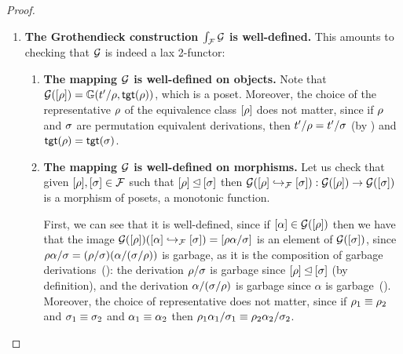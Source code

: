 \begin{proof}
\begin{enumerate}
\item {\bf The Grothendieck construction $\int_{\mathcal{F}}{\mathcal{G}}$ is well-defined.}
  This amounts to checking that $\mathcal{G}$ is indeed a lax 2-functor:
  \begin{enumerate}
  \item {\bf The mapping $\mathcal{G}$ is well-defined on objects.}
    Note that $\mathcal{G}({[\rho]}) = \mathbb{G}(t'/\rho, \mathsf{tgt}(\rho))$, which is a poset.
    Moreover, the choice of the representative $\rho$ of the equivalence class ${[\rho]}$
    does not matter,
    since if $\rho$ and $\sigma$ are permutation equivalent derivations,
    then $t'/\rho = t'/\sigma$ (by )
    and $\mathsf{tgt}(\rho) = \mathsf{tgt}(\sigma)$.
  \item {\bf The mapping $\mathcal{G}$ is well-defined on morphisms.}
    Let us check that given ${[\rho]},{[\sigma]} \in \mathcal{F}$
    such that ${[\rho]} \unlhd {[\sigma]}$
    then
    $
      \mathcal{G}({[\rho]} \hookrightarrow_{\mathcal{F}} {[\sigma]}) : \mathcal{G}({[\rho]}) \to \mathcal{G}({[\sigma]})
    $ is a morphism of posets, \ie a monotonic function.

    First, we can see that it is well-defined,
    since if ${[\alpha]} \in \mathcal{G}([\rho])$
    then we have that the image $\mathcal{G}({[\rho]})({[\alpha]} \hookrightarrow_{\mathcal{F}} {[\sigma]}) = {[\rho\alpha/\sigma]}$
    is an element of $\mathcal{G}([\sigma])$,
    since
    $
      \rho\alpha/\sigma = (\rho/\sigma)(\alpha/(\sigma/\rho))
    $
    is garbage, as it is the composition of garbage derivations~():
    the derivation $\rho/\sigma$ is garbage since ${[\rho]} \unlhd {[\sigma]}$ (by definition),
    and the derivation $\alpha/(\sigma/\rho)$ is garbage since $\alpha$ is garbage~().
    Moreover, the choice of representative does not matter,
    since if $\rho_1 \equiv \rho_2$ and $\sigma_1 \equiv \sigma_2$ and $\alpha_1 \equiv \alpha_2$
    then $\rho_1\alpha_1/\sigma_1 \equiv \rho_2\alpha_2/\sigma_2$.


\end{enumerate}
\end{enumerate}
\end{proof}
